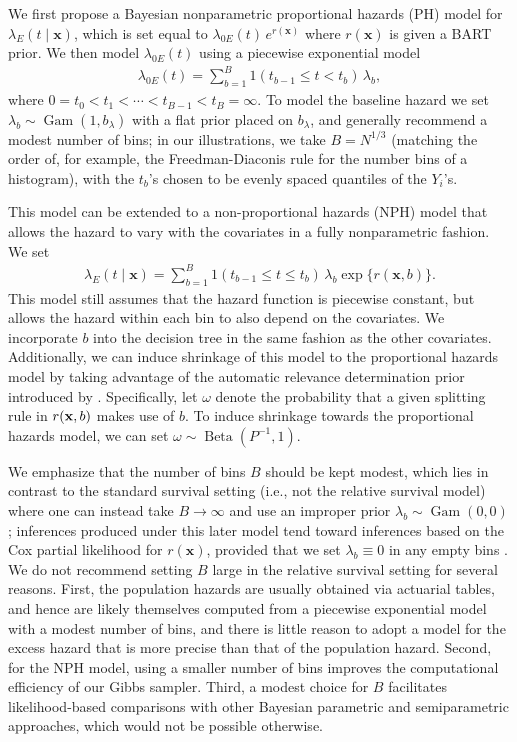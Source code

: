 \documentclass[12pt]{article}
\newcommand{\Beta}{\operatorname{Beta}}
\newcommand{\Gam}{\operatorname{Gam}}
\newcommand{\bx}{\mathbf{x}}
\newcommand{\bfx}{{\bf x}}
\begin{document}
We first propose a Bayesian nonparametric proportional hazards (PH) model for
$\lambda_E(t \mid \bx)$, which is set equal to $\lambda_{0E}(t) \, e^{r(\bx)}$
where $r(\bx)$ is given a BART prior. We then model $\lambda_{0E}(t)$ using a
piecewise exponential model
\begin{align*}
  \lambda_{0E}(t) = \sum_{b=1}^B 1(t_{b-1} \le t < t_b) \, \lambda_b,  
\end{align*}
where $0 = t_0 < t_1 < \cdots < t_{B - 1} < t_B = \infty $. To model the baseline hazard we set $\lambda_b \sim \Gam(1, b_\lambda)$ with a flat prior placed on $b_\lambda$, and generally recommend a modest number of bins; in our illustrations, we take $B = N^{1/3}$ (matching the order of, for example, the Freedman-Diaconis rule for the number bins of a histogram), with the $t_b$'s chosen to be evenly spaced quantiles of the $Y_i$'s. 

This model can be extended to a non-proportional hazards (NPH) model that allows the hazard to vary with the covariates in a fully nonparametric fashion. We set
\begin{align*}
    \lambda_E(t \mid \bx)
    = \sum_{b = 1}^B 1(t_{b-1} \le t \le t_b) \, \lambda_b \exp\{r(\bx, b)\}.
\end{align*}
This model still assumes that the hazard function is piecewise constant, but allows the hazard within each bin to also depend on the covariates. We incorporate $b$ into the decision tree in the same fashion as the other covariates. Additionally, we can induce shrinkage of this model to the proportional hazards model by taking advantage of the automatic relevance determination prior introduced by \citet{linero2016bayesian}. Specifically, let $\omega$ denote the probability that a given splitting rule in $r(\bfx, b)$ makes use of $b$. To induce shrinkage towards the proportional hazards model, we can set $\omega \sim \Beta(P^{-1}, 1)$.

We emphasize that the number of bins $B$ should be kept modest, which lies in contrast to the standard survival setting (i.e., not the relative survival model) where one can instead take $B \to \infty$ and use an improper prior $\lambda_b \sim \Gam(0, 0)$; inferences produced under this later model tend toward inferences based on the Cox partial likelihood for $r(\bx)$, provided that we set $\lambda_b \equiv 0$ in any empty bins \citep{sinha2003bayesian}. We do not recommend setting $B$ large in the relative survival setting for several reasons. First, the population hazards are usually obtained via actuarial tables, and hence are likely themselves computed from a piecewise exponential model with a modest number of bins, and there is little reason to adopt a model for the excess hazard that is more precise than that of the population hazard. Second, for the NPH model, using a smaller number of bins improves the computational efficiency of our Gibbs sampler. Third, a modest choice for $B$ facilitates likelihood-based comparisons with other Bayesian parametric and semiparametric approaches, which would not be possible otherwise.
\end{document}
